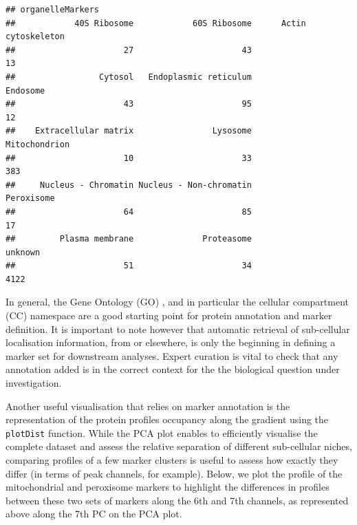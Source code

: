 \begin{knitrout}
\color{fgcolor}\begin{kframe}
\begin{alltt}
 \hlkwb{<-}   \hlstd{=} \hlstd{,}  \hlstd{=} \hlstd{)}
\end{alltt}
\begin{verbatim}
## organelleMarkers
##            40S Ribosome            60S Ribosome      Actin cytoskeleton 
##                      27                      43                      13 
##                 Cytosol   Endoplasmic reticulum                Endosome 
##                      43                      95                      12 
##    Extracellular matrix                Lysosome           Mitochondrion 
##                      10                      33                     383 
##     Nucleus - Chromatin Nucleus - Non-chromatin              Peroxisome 
##                      64                      85                      17 
##         Plasma membrane              Proteasome                 unknown 
##                      51                      34                    4122
\end{verbatim}
\end{kframe}
\end{knitrout}

In general, the Gene Ontology (GO) \cite{Ashburner:2000}, and in
particular the cellular compartment (CC) namespace are a good starting
point for protein annotation and marker definition. It is important to
note however that automatic retrieval of sub-cellular localisation
information, from  or elsewhere, is only the
beginning in defining a marker set for downstream analyses. Expert
curation is vital to check that any annotation added is in the correct
context for the the biological question under investigation.

Another useful visualisation that relies on marker annotation is the
representation of the protein profiles occupancy along the gradient
using the \texttt{plotDist} function. While the PCA plot enables to
efficiently visualise the complete dataset and assess the relative
separation of different sub-cellular niches, comparing profiles of a
few marker clusters is useful to assess how exactly they differ (in
terms of peak channels, for example). Below, we plot the profile of
the mitochondrial and peroxisome markers to highlight the differences
in profiles between these two sets of markers along the 6th and 7th
channels, as represented above along the 7th PC on the PCA plot.

